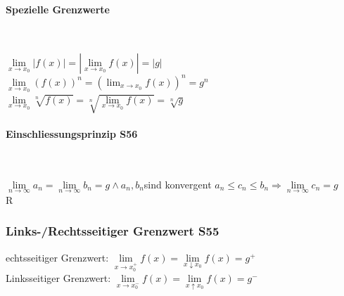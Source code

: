 \paragraph{Spezielle Grenzwerte}\

$\lim\limits_{x\to x_{0}} |f(x)|=|\lim\limits_{x\to x_{0}}f(x)|=|g|$ \qquad
$\lim\limits_{x\to x_{0}} (f(x))^{n}=(\lim_{x \rightarrow x_{0}}f(x))^{n}=g^{n}$\qquad
$\lim\limits_{x\to x_{0}} \sqrt[n]{f(x)}=\sqrt[n]{\lim\limits_{x\to x_{0}}f(x)}=\sqrt[n]{g}$\\

\paragraph{Einschliessungsprinzip \color{red} S56}\

$\lim\limits_{n\to\infty} a_{n}=\lim\limits_{n\to\infty} b_{n}=g\wedge a_{n},b_{n}$sind konvergent \qquad\qquad $a_{n}\leq c_{n}\leq b_{n}\Rightarrow \lim\limits_{n\to\infty} c_{n}= g$\\


R\subsubsection{Links-/Rechtsseitiger Grenzwert \color{red}S55}echtsseitiger Grenzwert: 	$\lim\limits_{x\to x_{0}^{+}}f(x)= \lim\limits_{x\downarrow x_{0}}f(x)=g^{+}$\\
Linksseitiger Grenzwert:	$\lim\limits_{x\to x_{0}^{-}}f(x)= \lim\limits_{x\uparrow x_{0}}f(x)=g^{-}$\\

